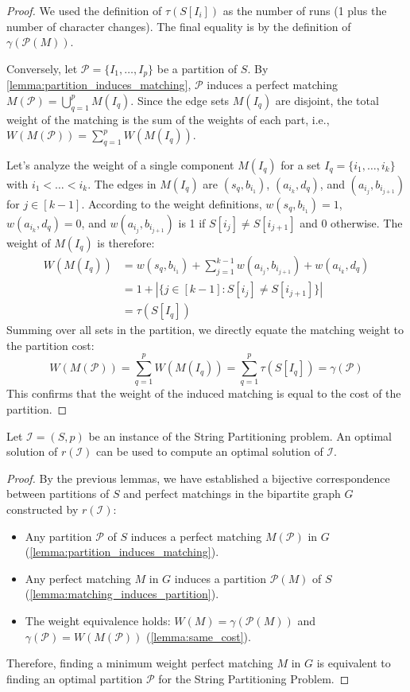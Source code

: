 \begin{proof}
    We used the definition of $\tau(S[I_i])$ as the number of runs (1 plus the number of character changes). The final equality is by the definition of $\gamma(\mathcal{P}(M))$.
    
    Conversely, let $\mathcal{P} = \{I_1, \ldots, I_p\}$ be a partition of $S$. By \cref{lemma:partition_induces_matching}, $\mathcal{P}$ induces a perfect matching $M(\mathcal{P}) = \bigcup_{q=1}^p M(I_q)$. Since the edge sets $M(I_q)$ are disjoint, the total weight of the matching is the sum of the weights of each part, i.e., $W(M(\mathcal{P})) = \sum_{q=1}^p W(M(I_q))$.

    Let's analyze the weight of a single component $M(I_q)$ for a set $I_q = \{i_1, \dots, i_k\}$ with $i_1 < \dots < i_k$. The edges in $M(I_q)$ are $(s_q, b_{i_1})$, $(a_{i_k}, d_q)$, and $(a_{i_j}, b_{i_{j+1}})$ for $j \in [k-1]$. According to the weight definitions, $w(s_q, b_{i_1})=1$, $w(a_{i_k}, d_q)=0$, and $w(a_{i_j}, b_{i_{j+1}})$ is 1 if $S[i_j] \neq S[i_{j+1}]$ and 0 otherwise. The weight of $M(I_q)$ is therefore:
    \begin{align*}
        W(M(I_q)) &= w(s_q, b_{i_1}) + \sum_{j=1}^{k-1} w(a_{i_j}, b_{i_{j+1}}) + w(a_{i_k}, d_q) \\
                  &= 1 + |\{j \in [k-1] : S[i_j] \neq S[i_{j+1}]\}| \\
                  &= \tau(S[I_q])
    \end{align*}
    Summing over all sets in the partition, we directly equate the matching weight to the partition cost:
    $$
        W(M(\mathcal{P})) = \sum_{q=1}^p W(M(I_q)) = \sum_{q=1}^p \tau(S[I_q]) = \gamma(\mathcal{P})
    $$
    This confirms that the weight of the induced matching is equal to the cost of the partition.
\end{proof}

\begin{theorem}
    Let $\mathcal{I}=(S,p)$ be an instance of the String Partitioning problem. An optimal solution of $r(\mathcal{I})$ can be used to compute an optimal solution of $\mathcal{I}$.
\end{theorem}
\begin{proof}
    By the previous lemmas, we have established a bijective correspondence between partitions of $S$ and perfect matchings in the bipartite graph $G$ constructed by $r(\mathcal{I})$:
    \begin{itemize}
        \item Any partition $\mathcal{P}$ of $S$ induces a perfect matching $M(\mathcal{P})$ in $G$ (\cref{lemma:partition_induces_matching}).
        \item Any perfect matching $M$ in $G$ induces a partition $\mathcal{P}(M)$ of $S$ (\cref{lemma:matching_induces_partition}).
        \item The weight equivalence holds: $W(M) = \gamma(\mathcal{P}(M))$ and $\gamma(\mathcal{P}) = W(M(\mathcal{P}))$ (\cref{lemma:same_cost}).
    \end{itemize}
    
    Therefore, finding a minimum weight perfect matching $M$ in $G$ is equivalent to finding an optimal partition $\mathcal{P}$ for the String Partitioning Problem.
\end{proof}

